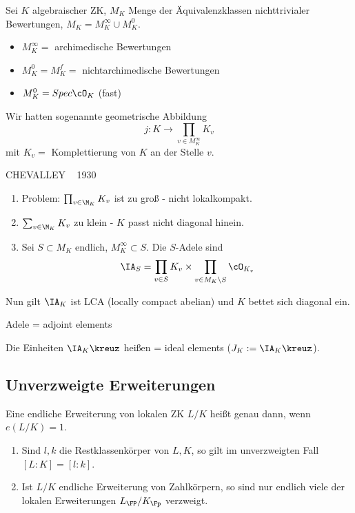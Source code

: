 \begin{Bemerkung}
 Sei $K$ algebraischer ZK, $M_K$ Menge der Äquivalenzklassen nichttrivialer Bewertungen, $M_K=M_K^\infty\cup M_K^0$.
 \begin{itemize}
  \item $M_K^\infty = $ archimedische Bewertungen
  \item $M_K^0=M_K^f=$ nichtarchimedische Bewertungen
  \item $M_K^0 = Spec \cO_K$ (fast)
 \end{itemize}
 Wir hatten sogenannte geometrische Abbildung \[ j: K\rightarrow \prod_{v\in M_K^\infty} K_v\]
 mit $K_v = $ Komplettierung von $K$ an der Stelle $v$. 
 
 CHEVALLEY ~ 1930
\begin{enumerate}
 \item Problem: $\prod_{v\in\M_K} K_v$ ist zu groß - nicht lokalkompakt.
 \item $\sum_{v\in\M_K} K_v$ zu klein - $K$ passt nicht diagonal hinein.
 \item Sei $S\subset M_K$ endlich, $M_K^\infty\subset S$. Die $S$-Adele sind
 \[ \IA_S=\prod_{v\in S} K_v \times \prod_{v\in M_K\setminus S} \cO_{K_v}\]
 
\end{enumerate}
Nun gilt $\IA_K$ ist LCA (locally compact abelian) und $K$ bettet sich diagonal ein.

Adele = adjoint elements

Die Einheiten $\IA_K\kreuz$ heißen  = ideal elements ($J_K:=\IA_K\kreuz$).
\end{Bemerkung}


\subsection{Unverzweigte Erweiterungen}

\begin{Definition}
 Eine endliche Erweiterung von lokalen ZK $L/K$ heißt  genau dann, wenn $e(L/K)=1$.
\end{Definition}

\begin{Bemerkung}
 \begin{enumerate}
  \item Sind $l,k$ die Restklassenkörper von $L,K$, so gilt im unverzweigten Fall $[L:K]=[l:k]$.
  \item Ist $L/K$ endliche Erweiterung von Zahlkörpern, so sind nur endlich viele der lokalen Erweiterungen $L_\FP/K_\Fp$ verzweigt.
 \end{enumerate}
\end{Bemerkung}

